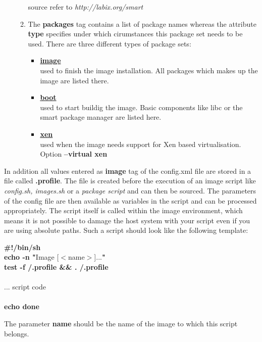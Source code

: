 \begin{itemize}
\begin{enumerate}
                source refer to \textit{http://labix.org/smart}
		  \item The \textbf{packages} tag contains a list of package names
                whereas the attribute \textbf{type} specifies under which
                cirumstances this package set needs to be used. There are
                three different types of package sets:
                \begin{itemize}
                \item \textbf{\underline{image}}\\
                      used to finish the image installation. All packages
                      which makes up the image are listed there.
                \item \textbf{\underline{boot}}\\
                      used to start buildig the image. Basic components
                      like libc or the smart package manager are listed
                      here.
                \item \textbf{\underline{xen}}\\
                      used when the image needs support for Xen based
                      virtualisation. Option \textbf{--virtual xen}
                \end{itemize} 
      \end{enumerate}
\end{itemize}

In addition all values entered as \textbf{image} tag of the config.xml
file are stored in a file called \textbf{.profile}. The file is created
before the execution of an image script like \textit{config.sh, images.sh}
or a \textit{package script} and can then be sourced. The parameters
of the config file are then available as variables in the
script and can be processed appropriately. The script itself is called
within the image environment, which means it
is not possible to damage the host system with your script even if you
are using absolute paths. Such a script should look like the following
template:

\begin{Command}{9cm}
\textbf{\#!/bin/sh}\\
\textbf{echo -n "}Image [$<$name$>$]...\textbf{"}\\
\textbf{test -f /.profile \&\& . /.profile}\\
\\
... script code\\
\\
\textbf{echo done}
\end{Command}

The parameter \textbf{name} should be the name of the image to which this
script belongs.
